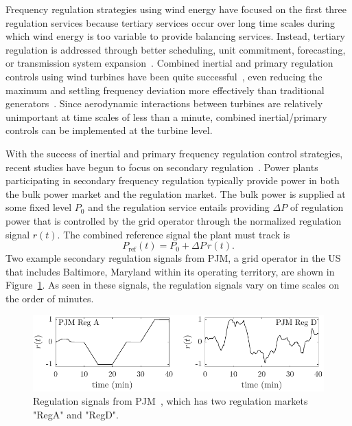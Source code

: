 Frequency regulation strategies using wind energy have focused on the first three regulation services because tertiary services occur over long time scales during which wind energy is too variable to provide balancing services. Instead, tertiary regulation is addressed through better scheduling, unit commitment, forecasting, or transmission system expansion~\cite{DOE2008a}. Combined inertial and primary regulation controls using wind turbines have been quite successful~\cite{Holdsworth2004a, Almeida2007a, Ma2010a, Morren2006a, Erlich2010a, Miller2011a, Hansen2014a}, even reducing the maximum and settling frequency deviation more effectively than traditional generators~\cite{Miller2011a, Gevorgian2015a}. Since aerodynamic interactions between turbines are relatively unimportant at time scales of less than a minute, combined inertial/primary controls can be implemented at the turbine level. 

With the success of inertial and primary frequency regulation control strategies, recent studies have begun to focus on secondary regulation~\cite{Buckspan2012a, Buckspan2013a, Aho2013a, Aho2014a, Jeong2014a, vanWingerden2017a, Boersma2017a}. Power plants participating in secondary frequency regulation typically provide power in both the bulk power market and the regulation market. The bulk power is supplied at some fixed level $P_0$ and the regulation service entails providing $\Delta P$ of regulation power that is controlled by the grid operator through the normalized regulation signal $r(t)$. The combined reference signal the plant must track is
\begin{equation}
P_\text{ref}(t) = P_0 + \Delta P \, r(t).
\end{equation}
Two example secondary regulation signals from PJM, a grid operator in the US that includes Baltimore, Maryland within its operating territory, are shown in Figure~\ref{fig:pjm}. As seen in these signals, the regulation signals vary on time scales on the order of minutes.

\begin{figure}[h]
\begin{center}
\includegraphics[width=\textwidth]{./fig/pjm.pdf}
\end{center}
\caption{Regulation signals from PJM~\cite{PJMm11, PJM2018a}, which has two regulation markets "RegA" and "RegD".}
\label{fig:pjm}
\end{figure}

